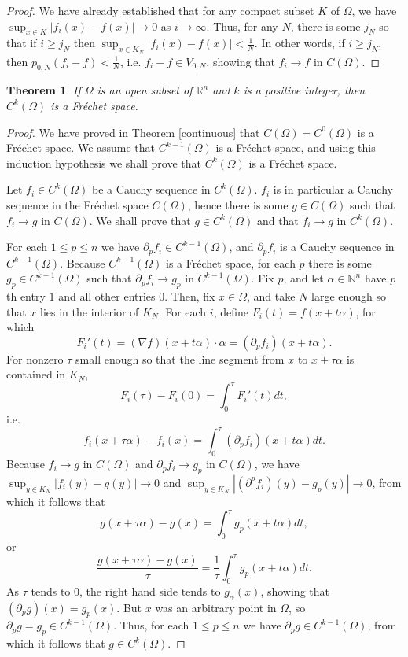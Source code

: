 \documentclass{article}
\newtheorem{theorem}{Theorem}
\begin{document}
\begin{proof}
We have already established that for any compact subset $K$ of $\Omega$, we have $\sup_{x \in K} |f_i(x)-f(x)| \to 0$ as $i \to \infty$. 
Thus, for any $N$, there is some $j_N$ so that if $i \geq j_N$ then  $\sup_{x \in K_N} |f_i(x)-f(x)| < \frac{1}{N}$. In other words, if
$i \geq j_N$, then $p_{0,N}(f_i-f) < \frac{1}{N}$, i.e. $f_i -f \in V_{0,N}$, showing that $f_i \to f$ in $C(\Omega)$.
\end{proof}




\begin{theorem}
If $\Omega$ is an open subset of $\mathbb{R}^n$ and $k$ is a positive integer, then $C^k(\Omega)$ is a Fr\'echet space.
\label{Ckfrechet}
\end{theorem}
\begin{proof}
We have proved in  Theorem \ref{continuous}  that $C(\Omega)=C^0(\Omega)$ is a Fr\'echet space. We
 assume  that $C^{k-1}(\Omega)$ is a Fr\'echet space, and using this induction hypothesis we shall prove that $C^k(\Omega)$ is a Fr\'echet space.

Let $f_i \in C^k(\Omega)$ be a Cauchy sequence in $C^k(\Omega)$. $f_i$ is in particular a Cauchy sequence in the Fr\'echet space $C(\Omega)$, hence there is some $g \in C(\Omega)$ such that
$f_i \to g$ in $C(\Omega)$. We shall prove that $g \in C^k(\Omega)$ and that $f_i \to g$ in $C^k(\Omega)$. 

For each $1 \leq p \leq n$ we have $\partial_p f_i \in C^{k-1}(\Omega)$, and $\partial_p f_i$  is a Cauchy sequence in $C^{k-1}(\Omega)$. Because $C^{k-1}(\Omega)$
is a Fr\'echet space, for each $p$ there is some $g_p \in C^{k-1}(\Omega)$ such that $\partial_p f_i \to g_p$ in $C^{k-1}(\Omega)$. Fix $p$, and let $\alpha \in \mathbb{N}^n$ have
$p$th entry $1$ and all other entries $0$. Then, fix $x \in \Omega$, and take $N$ large enough so that $x$ lies in the interior of $K_N$.
For each $i$, define $F_i(t)=f(x+t\alpha)$, for which
\[
F_i'(t)=(\nabla f)(x+t\alpha) \cdot \alpha = (\partial_p f_i)(x+t\alpha).
\]
For nonzero $\tau$ small enough so that the line segment from $x$ to $x+\tau\alpha$ is contained in $K_N$,
\[
F_i(\tau)-F_i(0) = \int_0^\tau F_i'(t) dt,
\]
i.e.
\[
f_i(x+\tau\alpha)-f_i(x) = \int_0^\tau (\partial_p f_i)(x+t\alpha) dt.
\]
Because $f_i \to g$ in $C(\Omega)$ and $\partial_p f_i \to g_p$ in $C(\Omega)$, we have 
$\sup_{y \in K_N} |f_i(y)-g(y)| \to 0$ and $\sup_{y \in K_N} |(\partial^p f_i)(y)-g_p(y)| \to 0$, from which it follows that
\[
g(x+\tau\alpha)-g(x) = \int_0^\tau g_p(x+t\alpha) dt,
\]
or
\[
\frac{g(x+\tau\alpha)-g(x)}{\tau} = \frac{1}{\tau} \int_0^\tau g_p(x+t\alpha) dt.
\]
As $\tau$ tends to $0$, the right hand side tends to $g_\alpha(x)$, showing that $(\partial_p g)(x)=g_p(x)$. 
But $x$ was an arbitrary point in $\Omega$, so $\partial_p g = g_p \in C^{k-1}(\Omega)$. Thus, for each $1 \leq p \leq n$ we have
$\partial_p g \in C^{k-1}(\Omega)$, from which it follows that $g \in C^k(\Omega)$.
\end{proof}
\end{document}
